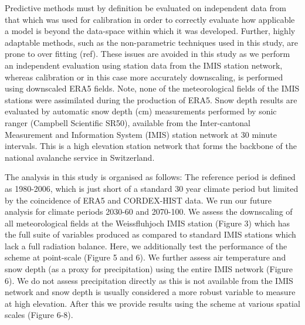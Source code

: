 \documentclass[hess, manuscript]{copernicus}
\begin{document}
 Predictive methods must by definition be evaluated on independent data from that which was used for calibration in order to correctly evaluate how applicable a model is beyond the data-space within which it was developed. Further, highly adaptable methods, such as the non-parametric techniques used in this study, are prone to over fitting (ref). These issues are avoided in this study as we perform an independent evaluation using station data from the IMIS station network, whereas calibration or in this case more accurately downscaling, is performed using downscaled ERA5 fields. Note, none of the meteorological fields of the IMIS stations were assimilated during the production of ERA5.
 Snow depth results are evaluated by automatic snow depth (cm) measurements performed by sonic ranger (Campbell Scientific SR50), available from the Inter-cantonal Measurement and Information System (IMIS) station network at 30 minute intervals. This is a high elevation station network that forms the backbone of the national avalanche service in Switzerland.
 
 The analysis in this study is organised as follows: The reference period is defined as 1980-2006, which is just short of a standard 30 year climate period but limited by the coincidence of ERA5 and CORDEX-HIST data. We run our future analysis for climate periods 2030-60 and 2070-100. We assess the downscaling of all meteorological fields at the Weissfluhjoch IMIS station (Figure 3) which has the full suite of variables produced as compared to standard IMIS stations which lack a full radiation balance. Here, we additionally test the performance of the scheme at point-scale (Figure 5 and 6). We further assess air temperature and snow depth (as a proxy for precipitation) using the entire IMIS network (Figure 6). We do not assess precipitation directly as this is not available from the IMIS network and snow depth is usually considered a more robust variable to measure at high elevation. After this we provide results using the scheme at various spatial scales (Figure 6-8).
 
\end{document}
